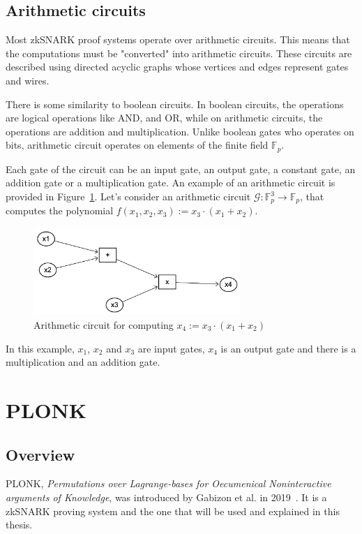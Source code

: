 \subsection{Arithmetic circuits}
Most zkSNARK proof systems operate over arithmetic circuits. This means that the computations must be "converted" into arithmetic circuits. These circuits are described using directed acyclic graphs whose vertices and edges represent gates and wires.

There is some similarity to boolean circuits. In boolean circuits, the operations are logical operations like AND, and OR, while on arithmetic circuits, the operations are addition and multiplication. Unlike boolean gates who operates on bits, arithmetic circuit operates on elements of the finite field $\mathbb{F}_p$.

Each gate of the circuit can be an input gate, an output gate, a constant gate, an addition gate or a multiplication gate. An example of an arithmetic circuit is provided in Figure~\ref{fig:arithmetic-circuit}. Let's consider an arithmetic circuit $\mathcal{G}: \mathbb{F}_p^3\longrightarrow\mathbb{F}_p$, that computes the polynomial $f(x_1,x_2,x_3):=x_3\cdot(x_1+x_2)$.

\begin{figure}[h]
    \centering
    \includegraphics[width=0.7\textwidth]{graphics/arithmetic-circuit.png}
    \caption{Arithmetic circuit for computing $x_4:=x_3\cdot(x_1+x_2)$}
    \label{fig:arithmetic-circuit}
\end{figure}

In this example, $x_1$, $x_2$ and $x_3$ are input gates, $x_4$ is an output gate and there is a multiplication and an addition gate.


\section{PLONK}
\label{sec:plonk}
\subsection*{Overview}
PLONK, \textit{Permutations over Lagrange-bases for Oecumenical Noninteractive arguments of Knowledge}, was introduced by Gabizon et al. in 2019~\cite{gabizon2019plonk}. It is a zkSNARK proving system and the one that will be used and explained in this thesis.

